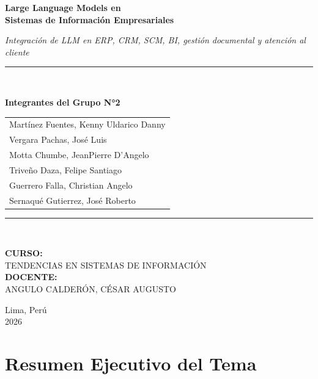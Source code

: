 \documentclass[12pt,a4paper,oneside]{article}
\begin{document}
\begin{titlepage}
    \centering
    \vspace*{1cm}
    {\Huge\bfseries Large Language Models en\\[0.3cm] Sistemas de Información Empresariales\par}
    \vspace{1.5cm}
    {\Large\itshape Integración de LLM en ERP, CRM, SCM, BI, gestión documental y atención al cliente\par}
    \vspace{2cm}
    \rule{0.8\textwidth}{0.5pt}\\[0.5cm]
    {\Large\bfseries Integrantes del Grupo N°2\par}
    \vspace{0.5cm}
    \begin{tabular}{l}
        Martínez Fuentes, Kenny Uldarico Danny \\
        Vergara Pachas, José Luis \\
        Motta Chumbe, JeanPierre D'Angelo \\
        Triveño Daza, Felipe Santiago \\
        Guerrero Falla, Christian Angelo \\
        Sernaqué Gutierrez, José Roberto \\
    \end{tabular}
    \rule{0.8\textwidth}{0.5pt}\\[1.5cm]
    \begin{flushleft}
        \textbf{CURSO:} \\
        TENDENCIAS EN SISTEMAS DE INFORMACIÓN \\[0.5cm]
        \textbf{DOCENTE:} \\
        ANGULO CALDERÓN, CÉSAR AUGUSTO
    \end{flushleft}
    \vfill
    {\Large Lima, Perú\\2026\par}
\end{titlepage}

\tableofcontents
\newpage

\section{Resumen Ejecutivo del Tema}
\end{document}
